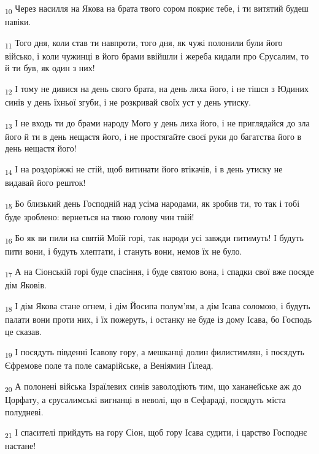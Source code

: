 \begin{tcolorbox}
\textsubscript{10} Через насилля на Якова на брата твого сором покриє тебе, і ти витятий будеш навіки.
\end{tcolorbox}
\begin{tcolorbox}
\textsubscript{11} Того дня, коли став ти навпроти, того дня, як чужі полонили були його військо, і коли чужинці в його брами ввійшли і жереба кидали про Єрусалим, то й ти був, як один з них!
\end{tcolorbox}
\begin{tcolorbox}
\textsubscript{12} І тому не дивися на день свого брата, на день лиха його, і не тішся з Юдиних синів у день їхньої згуби, і не розкривай своїх уст у день утиску.
\end{tcolorbox}
\begin{tcolorbox}
\textsubscript{13} І не входь ти до брами народу Мого у день лиха його, і не приглядайся до зла його й ти в день нещастя його, і не простягайте своєї руки до багатства його в день нещастя його!
\end{tcolorbox}
\begin{tcolorbox}
\textsubscript{14} І на роздоріжжі не стій, щоб витинати його втікачів, і в день утиску не видавай його решток!
\end{tcolorbox}
\begin{tcolorbox}
\textsubscript{15} Бо близький день Господній над усіма народами, як зробив ти, то так і тобі буде зроблено: вернеться на твою голову чин твій!
\end{tcolorbox}
\begin{tcolorbox}
\textsubscript{16} Бо як ви пили на святій Моїй горі, так народи усі завжди питимуть! І будуть пити вони, і будуть хлептати, і стануть вони, немов їх не було.
\end{tcolorbox}
\begin{tcolorbox}
\textsubscript{17} А на Сіонській горі буде спасіння, і буде святою вона, і спадки свої вже посяде дім Яковів.
\end{tcolorbox}
\begin{tcolorbox}
\textsubscript{18} І дім Якова стане огнем, і дім Йосипа полум'ям, а дім Ісава соломою, і будуть палати вони проти них, і їх пожеруть, і останку не буде із дому Ісава, бо Господь це сказав.
\end{tcolorbox}
\begin{tcolorbox}
\textsubscript{19} І посядуть південні Ісавову гору, а мешканці долин филистимлян, і посядуть Єфремове поле та поле самарійське, а Веніямин Ґілеад.
\end{tcolorbox}
\begin{tcolorbox}
\textsubscript{20} А полонені війська Ізраїлевих синів заволодіють тим, що хананейське аж до Цорфату, а єрусалимські вигнанці в неволі, що в Сефараді, посядуть міста полудневі.
\end{tcolorbox}
\begin{tcolorbox}
\textsubscript{21} І спасителі прийдуть на гору Сіон, щоб гору Ісава судити, і царство Господнє настане!
\end{tcolorbox}
